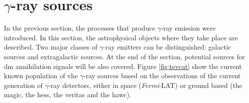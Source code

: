 \documentclass[main.tex]{subfiles}
\begin{document}
\section{$\gamma$-ray sources} \label{sec:gammasources}

In the previous section, the processes that produce $\gamma$-ray emission were introduced. In this section, the astrophysical objects where they take place are described. Two major classes of $\gamma$-ray emitters can be distinguished: galactic sources and extragalactic sources. At the end of the section, potential sources for \gls{dm} annihilation signals will be also covered. 
Figure \ref{fig:tevcat} show the current known population of \gls{vhe} $\gamma$-ray sources based on the observations of the current generation of $\gamma$-ray detectors, either in space (\textit{Fermi}-LAT) or ground based (the \gls{magic}, the \gls{hess}, the \gls{veritas} and the \gls{hawc}).  
\end{document}
